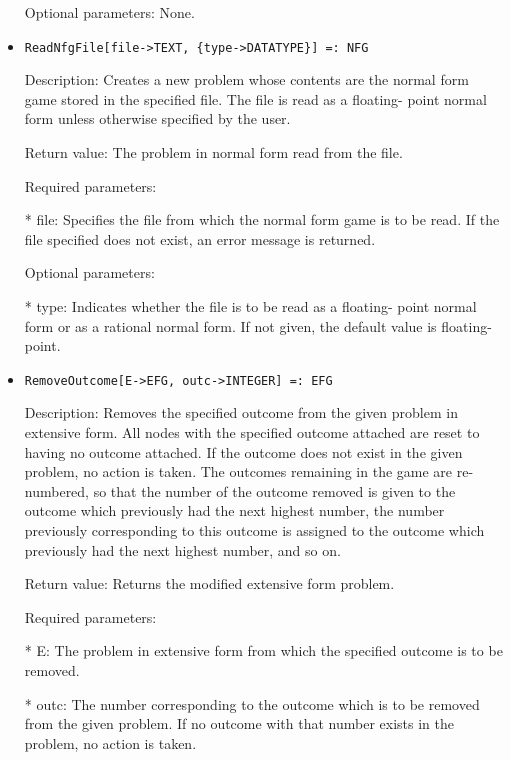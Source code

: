 \begin{itemize}
\item
[Optional parameters:] None.
\ed

\item
\begin{verbatim}
ReadNfgFile[file->TEXT, {type->DATATYPE}] =: NFG
\end{verbatim}

\bd
\item
[Description:] Creates a new problem whose contents are the normal form
game stored in the specified file.  The file is read as a floating-
point normal form unless otherwise specified by the user.
\item
[Return value:] The problem in normal form read from the file.
\item
[Required parameters:]\hfil\null

\bd
\item
[* file:] Specifies the file from which the normal form game is to be
read.  If the file specified does not exist, an error message
is returned.
\ed

\item
[Optional parameters:]\hfil\null
	

\bd
\item
[* type:] Indicates whether the file is to be read as a floating-
point normal form or as a rational normal form.  If not given,
the default value is floating-point.
\ed
\ed

\item

\begin{verbatim}
RemoveOutcome[E->EFG, outc->INTEGER] =: EFG
\end{verbatim}

\bd
\item
[Description:] Removes the specified outcome from the given problem in
extensive form.  All nodes with the specified outcome attached are 
reset to having no outcome attached.  If the outcome does not exist in
the given problem, no action is taken.  The outcomes remaining in the 
game are re-numbered, so that the number of the outcome removed is 
given to the outcome which previously had the next highest number, the
number previously corresponding to this outcome is assigned to the
outcome which previously had the next highest number, and so on.  
\item  
[Return value:] Returns the modified extensive form problem.
\item
[Required parameters:]\hfil\null
	
\bd
\item
[* E:] The problem in extensive form from which the specified outcome
is to be removed.
\item
[* outc:] The number corresponding to the outcome which is to be 
removed from the given problem.  If no outcome with that number
exists in the problem, no action is taken.
\ed
\ed


\end{itemize}
